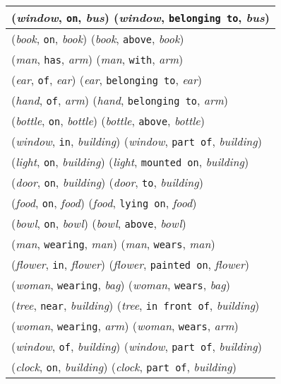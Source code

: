 \documentclass[runningheads]{llncs}
\begin{document}
{\begin{longtable}{ l }
(\textit{window}, \texttt{on}, \textit{bus})  (\textit{window}, \texttt{belonging to}, \textit{bus}) \\ \hline
(\textit{book}, \texttt{on}, \textit{book})  (\textit{book}, \texttt{above}, \textit{book}) \\ \hline
(\textit{man}, \texttt{has}, \textit{arm})  (\textit{man}, \texttt{with}, \textit{arm}) \\ \hline
(\textit{ear}, \texttt{of}, \textit{ear})  (\textit{ear}, \texttt{belonging to}, \textit{ear}) \\ \hline
(\textit{hand}, \texttt{of}, \textit{arm})  (\textit{hand}, \texttt{belonging to}, \textit{arm}) \\ \hline
(\textit{bottle}, \texttt{on}, \textit{bottle})  (\textit{bottle}, \texttt{above}, \textit{bottle}) \\ \hline
(\textit{window}, \texttt{in}, \textit{building})  (\textit{window}, \texttt{part of}, \textit{building}) \\ \hline
(\textit{light}, \texttt{on}, \textit{building})  (\textit{light}, \texttt{mounted on}, \textit{building}) \\ \hline
(\textit{door}, \texttt{on}, \textit{building})  (\textit{door}, \texttt{to}, \textit{building}) \\ \hline
(\textit{food}, \texttt{on}, \textit{food})  (\textit{food}, \texttt{lying on}, \textit{food}) \\ \hline
(\textit{bowl}, \texttt{on}, \textit{bowl})  (\textit{bowl}, \texttt{above}, \textit{bowl}) \\ \hline
(\textit{man}, \texttt{wearing}, \textit{man})  (\textit{man}, \texttt{wears}, \textit{man}) \\ \hline
(\textit{flower}, \texttt{in}, \textit{flower})  (\textit{flower}, \texttt{painted on}, \textit{flower}) \\ \hline
(\textit{woman}, \texttt{wearing}, \textit{bag})  (\textit{woman}, \texttt{wears}, \textit{bag}) \\ \hline
(\textit{tree}, \texttt{near}, \textit{building})  (\textit{tree}, \texttt{in front of}, \textit{building}) \\ \hline
(\textit{woman}, \texttt{wearing}, \textit{arm})  (\textit{woman}, \texttt{wears}, \textit{arm}) \\ \hline
(\textit{window}, \texttt{of}, \textit{building})  (\textit{window}, \texttt{part of}, \textit{building}) \\ \hline
(\textit{clock}, \texttt{on}, \textit{building})  (\textit{clock}, \texttt{part of}, \textit{building}) \\ \hline

\end{longtable}}
\end{document}
